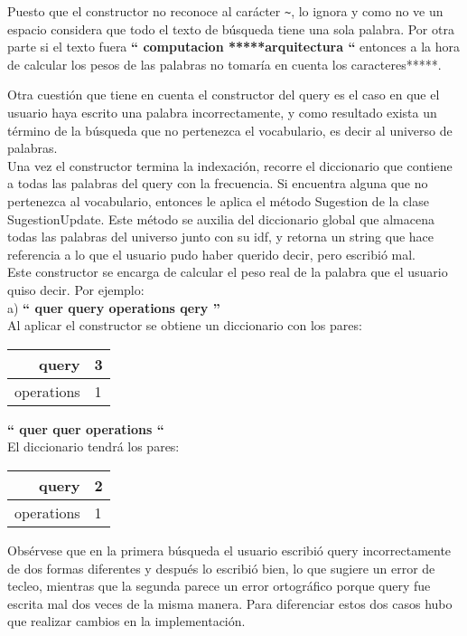 \documentclass[12pt]{article}
\begin{document}
\begin {enumerate}
Puesto que el constructor no reconoce al carácter \verb|~|, lo ignora y como no ve un espacio considera que todo el texto de b\'usqueda tiene una sola palabra.
Por otra parte si el texto fuera \textbf{ “ computacion *****arquitectura “}  entonces a la hora de calcular los pesos de las palabras no tomar\'ia en cuenta los caracteres*****.


Otra cuesti\'on que tiene en cuenta el constructor del query es el caso en que el usuario haya escrito una palabra incorrectamente, y como resultado exista un t\'ermino de la b\'usqueda que no pertenezca el vocabulario, es decir al universo de palabras.\\
Una vez el constructor termina la indexaci\'on, recorre el diccionario que contiene a todas las palabras del query con la frecuencia.
Si encuentra alguna que no pertenezca al vocabulario, entonces le aplica el m\'etodo Sugestion de la clase SugestionUpdate. Este m\'etodo se auxilia del diccionario global que almacena todas las palabras del universo junto con su idf, y retorna un string que hace referencia a lo que el usuario pudo haber querido decir, pero escribi\'o mal.\\

Este constructor se encarga de calcular el peso real de la palabra que el usuario quiso decir.
Por ejemplo:\\

 a) \textbf{“ quer query operations qery ”} \\
Al aplicar el constructor se obtiene un diccionario con los pares:\\
\begin{tabular}{|r|l|}
\hline
query & 3  \\
\hline
operations & 1 \\
\hline
\end{tabular}

  \textbf{“ quer quer operations “}     \\
El diccionario tendr\'a los pares: \\
\begin{tabular}{|r|l|}
\hline
query  &  2   \\
\hline
operations & 1\\ 
\hline
\end{tabular}

Obs\'ervese que en la primera b\'usqueda el usuario escribi\'o query incorrectamente de dos formas diferentes  y despu\'es lo escribi\'o bien,  lo que sugiere un error de tecleo, mientras que la segunda parece un error ortogr\'afico porque query fue escrita mal dos veces de la misma manera.  Para diferenciar estos dos casos hubo que realizar cambios en la implementaci\'on.



\end{enumerate}
\end{document}
